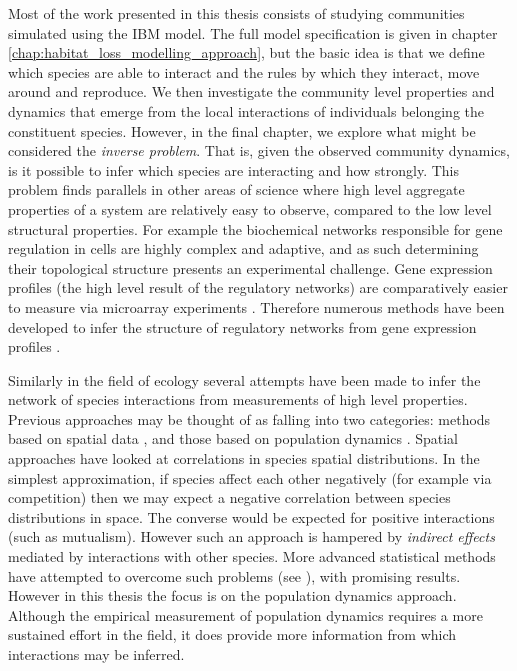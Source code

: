 Most of the work presented in this thesis consists of studying communities simulated using the IBM model. The full model specification is given in chapter \ref{chap:habitat_loss_modelling_approach}, but the basic idea is that we define which species are able to interact and the rules by which they interact, move around and reproduce. We then investigate the community level properties and dynamics that emerge from the local interactions of individuals belonging the constituent species. However, in the final chapter, we explore what might be considered the \emph{inverse problem}. That is, given the observed community dynamics, is it possible to infer which species are interacting and how strongly. This problem finds parallels in other areas of science  where high level aggregate properties of a system are relatively easy to observe, compared to the low level structural properties. For example the biochemical networks responsible for gene regulation in cells are highly complex and adaptive, and as such determining their topological structure presents an experimental challenge. Gene expression profiles (the high level result of the regulatory networks) are comparatively easier to measure via microarray experiments \cite{wang2006inferring}. Therefore numerous methods have been developed to infer the structure of regulatory networks from gene expression profiles \cite{zhao2006inferring,marbach2012wisdom}. 

Similarly in the field of ecology several attempts have been made to infer the network of species interactions from measurements of high level properties. Previous approaches may be thought of as falling into two categories: methods based on spatial data \cite{volkov2009,Harris018861}, and those based on population dynamics \cite{gilpin1973hares,sandvik2004using,froda2009simple,ives2003estimating,mutshinda2009drives}. Spatial approaches have looked at correlations in species spatial distributions. In the simplest approximation, if species affect each other negatively (for example via competition) then we may expect a negative correlation between species distributions in space. The converse would be expected for positive interactions (such as mutualism). However such an approach is hampered by \emph{indirect effects} mediated by interactions with other species. More advanced statistical methods have attempted to overcome such problems (see \cite{Harris018861}), with promising results. However in this thesis the focus is on the population dynamics approach. Although the empirical measurement of population dynamics requires a more sustained effort in the field, it does provide more information from which interactions may be inferred. %

